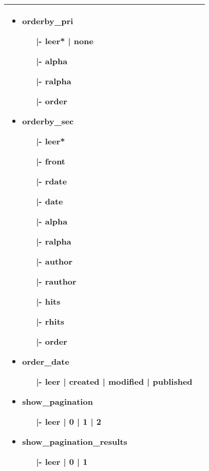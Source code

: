\begin{minipage}{0.7\textwidth}
\begin{tabular}{|p{} | p{}|}
\begin{itemize}
\item orderby\_pri
	\begin{enumerate}
		\item[|-] leer* | none
		\item[|-] alpha 
		\item[|-]ralpha
		\item[|-] order
	\end{enumerate}
\item orderby\_sec
	\begin{enumerate}
		\item[|-] leer* 
		\item[|-] front
		\item[|-] rdate 
		\item[|-] date
		\item[|-] alpha 
		\item[|-] ralpha
		\item[|-] author
		\item[|-] rauthor
		\item[|-] hits  
		\item[|-] rhits
		\item[|-] order
	\end{enumerate}
\item order\_date
	\begin{enumerate}
	\item[|-] leer | created | modified | published 
	\end{enumerate}
\item show\_pagination
	\begin{enumerate}
	\item[|-] leer | 0 | 1 | 2
	\end{enumerate}
\item show\_pagination\_results
	\begin{enumerate}
	\item[|-] leer | 0 | 1
	\end{enumerate}
\end{itemize}
\\
\hline
\end{tabular}
\end{minipage}

